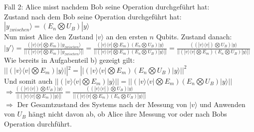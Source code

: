\documentclass[a4paper]{scrartcl}
\begin{document}
\begin{enumerate}[a)]
\noindent Fall 2: Alice misst nachdem Bob seine Operation durchgeführt hat:\\
Zustand nach dem Bob seine Operation durchgeführt hat:\\
$|y_{zwischen}\rangle= (E_n\bigotimes U_B)|y\rangle$\\
Nun misst Alice den Zustand $|v\rangle$ an den ersten $n$ Qubits. Zustand danach:\\
$|y'\rangle = \frac{(|v\rangle\langle v|\bigotimes E_m)|y_{zwischen}\rangle}{||(|v\rangle\langle v|\bigotimes E_m)|y_{zwischen}\rangle ||}= \frac{(|v\rangle\langle v|\bigotimes E_m)(E_n\bigotimes U_B)|y\rangle}{ ||(|v\rangle\langle v|\bigotimes E_m)(E_n\bigotimes U_B)|y\rangle ||}= \frac{((|v\rangle\langle v|)\bigotimes U_B)|y\rangle}{||(|v\rangle\langle v|\bigotimes E_m)(E_n\bigotimes U_B)|y\rangle ||}$\\
Wie bereits in Aufgabenteil b) gezeigt gilt: $||(|v\rangle\langle v|\bigotimes E_m)|y\rangle||^2= ||(|v\rangle\langle v|\bigotimes E_m)(E_n\bigotimes U_B)|y\rangle ||^2$\\
 Und somit auch $||(|v\rangle\langle v|\bigotimes E_m)|y\rangle||=||(|v\rangle\langle v|\bigotimes E_m)(E_n\bigotimes U_B)|y\rangle ||$\\
 $\Rightarrow \frac{((|v\rangle\langle v|)\bigotimes U_B)|y\rangle}{||(|v\rangle\langle v|\bigotimes E_m)|y\rangle||}= \frac{((|v\rangle\langle v|)\bigotimes U_B)|y\rangle}{||(|v\rangle\langle v|\bigotimes E_m)(E_n\bigotimes U_B)|y\rangle ||}$\\
 $\Rightarrow$ Der Gesamtzustand des Systems nach der Messung von $|v\rangle$ und Anwenden von $U_B$ hängt nicht davon ab, ob Alice ihre Messung vor oder nach Bobs Operation durchführt.
\end{enumerate}
\end{document}
